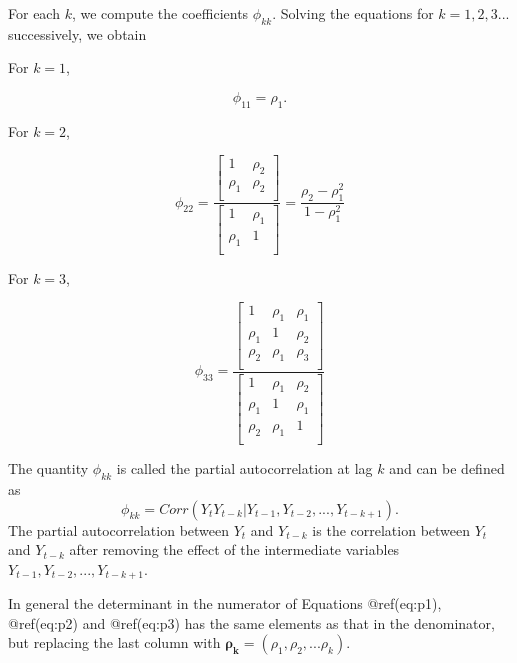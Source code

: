 \documentclass[
  11pt,
  a4paper,
]{report}
\begin{document}
For each \(k\), we compute the coefficients \(\phi_{kk}\). Solving the
equations for \(k=1, 2, 3...\) successively, we obtain

For \(k=1\),

\begin{equation}
\phi_{11}=\rho_1.
\end{equation}

For \(k=2\),

\begin{equation}
\phi_{22}=\frac{\left[\begin{array}
{rr}
1 & \rho_2  \\
\rho_1 & \rho_2  \\
\end{array}\right]}{\left[\begin{array}
{rr}
1 & \rho_1  \\
\rho_1 & 1  \\
\end{array}\right]} = \frac{\rho_2-\rho_1^2}{1-\rho_1^2}
\end{equation}

For \(k=3\),

\begin{equation}
\phi_{33}=\frac{\left[\begin{array}
{rrr}
1 & \rho_1 & \rho_1  \\
\rho_1 & 1 & \rho_2  \\
\rho_2 & \rho_1 & \rho_3  \\
\end{array}\right]}{\left[\begin{array}
{rrr}
1 & \rho_1 & \rho_2  \\
\rho_1 & 1 & \rho_1  \\
\rho_2 & \rho_1 & 1  \\
\end{array}\right]}
\end{equation}

The quantity \(\phi_{kk}\) is called the partial autocorrelation at lag
\(k\) and can be defined as
\[\phi_{kk}=Corr(Y_tY_{t-k}|Y_{t-1}, Y_{t-2},..., Y_{t-k+1}).\] The
partial autocorrelation between \(Y_t\) and \(Y_{t-k}\) is the
correlation between \(Y_t\) and \(Y_{t-k}\) after removing the effect of
the intermediate variables \(Y_{t-1}, Y_{t-2}, ..., Y_{t-k+1}\).

In general the determinant in the numerator of Equations @ref(eq:p1),
@ref(eq:p2) and @ref(eq:p3) has the same elements as that in the
denominator, but replacing the last column with
\(\bm{\rho_k}= (\rho_1, \rho_2,...\rho_k).\)
\end{document}
